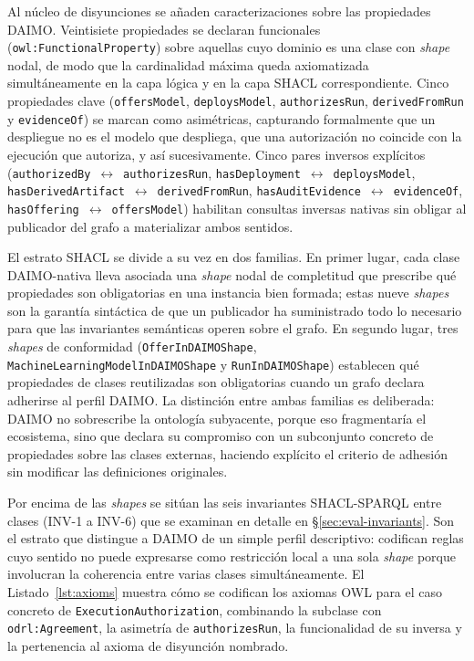 \documentclass[Afour,sagev,times]{sagej}
\newcommand{\code}[1]{\texttt{#1}}
\begin{document}
Al núcleo de disyunciones se añaden caracterizaciones sobre las propiedades DAIMO. Veintisiete propiedades se declaran funcionales (\code{owl:FunctionalProperty}) sobre aquellas cuyo dominio es una clase con \emph{shape} nodal, de modo que la cardinalidad máxima queda axiomatizada simultáneamente en la capa lógica y en la capa SHACL correspondiente. Cinco propiedades clave (\code{offersModel}, \code{deploysModel}, \code{authorizesRun}, \code{derivedFromRun} y \code{evidenceOf}) se marcan como asimétricas, capturando formalmente que un despliegue no es el modelo que despliega, que una autorización no coincide con la ejecución que autoriza, y así sucesivamente. Cinco pares inversos explícitos (\code{authorizedBy}~$\leftrightarrow$~\code{authorizesRun}, \code{hasDeployment}~$\leftrightarrow$~\code{deploysModel}, \code{hasDerivedArtifact}~$\leftrightarrow$~\code{derivedFromRun}, \code{hasAuditEvidence}~$\leftrightarrow$~\code{evidenceOf}, \code{hasOffering}~$\leftrightarrow$~\code{offersModel}) habilitan consultas inversas nativas sin obligar al publicador del grafo a materializar ambos sentidos.

El estrato SHACL se divide a su vez en dos familias. En primer lugar, cada clase DAIMO-nativa lleva asociada una \emph{shape} nodal de completitud que prescribe qué propiedades son obligatorias en una instancia bien formada; estas nueve \emph{shapes} son la garantía sintáctica de que un publicador ha suministrado todo lo necesario para que las invariantes semánticas operen sobre el grafo. En segundo lugar, tres \emph{shapes} de conformidad (\code{OfferInDAIMOShape}, \code{MachineLearningModelInDAIMOShape} y \code{RunInDAIMOShape}) establecen qué propiedades de clases reutilizadas son obligatorias cuando un grafo declara adherirse al perfil DAIMO. La distinción entre ambas familias es deliberada: DAIMO no sobrescribe la ontología subyacente, porque eso fragmentaría el ecosistema, sino que declara su compromiso con un subconjunto concreto de propiedades sobre las clases externas, haciendo explícito el criterio de adhesión sin modificar las definiciones originales.

Por encima de las \emph{shapes} se sitúan las seis invariantes SHACL-SPARQL entre clases (INV-1 a INV-6) que se examinan en detalle en §\ref{sec:eval-invariants}. Son el estrato que distingue a DAIMO de un simple perfil descriptivo: codifican reglas cuyo sentido no puede expresarse como restricción local a una sola \emph{shape} porque involucran la coherencia entre varias clases simultáneamente. El Listado~\ref{lst:axioms} muestra cómo se codifican los axiomas OWL para el caso concreto de \code{ExecutionAuthorization}, combinando la subclase con \code{odrl:Agreement}, la asimetría de \code{authorizesRun}, la funcionalidad de su inversa y la pertenencia al axioma de disyunción nombrado.
\end{document}

